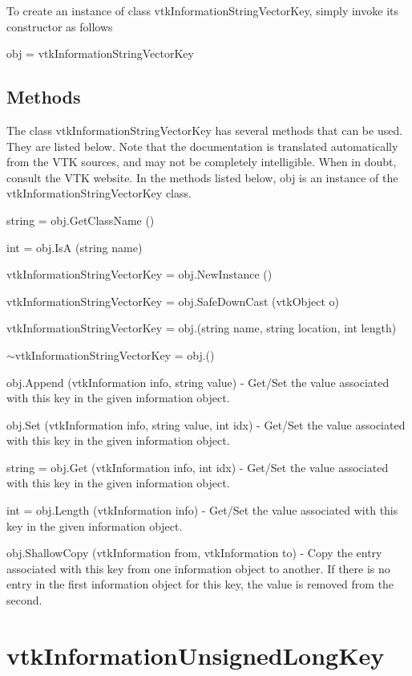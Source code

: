 To create an instance of class vtk\-Information\-String\-Vector\-Key, simply invoke its constructor as follows \begin{DoxyVerb}  obj = vtkInformationStringVectorKey
\end{DoxyVerb}
 \hypertarget{vtkwidgets_vtkxyplotwidget_Methods}{}\subsection{Methods}\label{vtkwidgets_vtkxyplotwidget_Methods}
The class vtk\-Information\-String\-Vector\-Key has several methods that can be used. They are listed below. Note that the documentation is translated automatically from the V\-T\-K sources, and may not be completely intelligible. When in doubt, consult the V\-T\-K website. In the methods listed below, {\ttfamily obj} is an instance of the vtk\-Information\-String\-Vector\-Key class. 
\begin{DoxyItemize}
\item {\ttfamily string = obj.\-Get\-Class\-Name ()}  
\item {\ttfamily int = obj.\-Is\-A (string name)}  
\item {\ttfamily vtk\-Information\-String\-Vector\-Key = obj.\-New\-Instance ()}  
\item {\ttfamily vtk\-Information\-String\-Vector\-Key = obj.\-Safe\-Down\-Cast (vtk\-Object o)}  
\item {\ttfamily vtk\-Information\-String\-Vector\-Key = obj.(string name, string location, int length)}  
\item {\ttfamily $\sim$vtk\-Information\-String\-Vector\-Key = obj.()}  
\item {\ttfamily obj.\-Append (vtk\-Information info, string value)} -\/ Get/\-Set the value associated with this key in the given information object.  
\item {\ttfamily obj.\-Set (vtk\-Information info, string value, int idx)} -\/ Get/\-Set the value associated with this key in the given information object.  
\item {\ttfamily string = obj.\-Get (vtk\-Information info, int idx)} -\/ Get/\-Set the value associated with this key in the given information object.  
\item {\ttfamily int = obj.\-Length (vtk\-Information info)} -\/ Get/\-Set the value associated with this key in the given information object.  
\item {\ttfamily obj.\-Shallow\-Copy (vtk\-Information from, vtk\-Information to)} -\/ Copy the entry associated with this key from one information object to another. If there is no entry in the first information object for this key, the value is removed from the second.  
\end{DoxyItemize}\hypertarget{vtkcommon_vtkinformationunsignedlongkey}{}\section{vtk\-Information\-Unsigned\-Long\-Key}\label{vtkcommon_vtkinformationunsignedlongkey}
